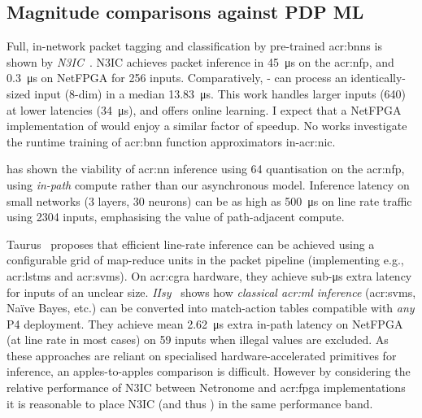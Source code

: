\subsection{Magnitude comparisons against PDP ML}
Full, in-network packet tagging and classification by pre-trained \glspl{acr:bnn} is shown by \emph{N3IC}~\parencite{DBLP:journals/corr/abs-2009-02353}.
N3IC achieves packet inference in \qty{45}{\micro\second} on the \gls{acr:nfp}, and \qty{0.3}{\micro\second} on NetFPGA for \qty{256}{\bit} inputs.
Comparatively, \approachshort{}-\Coopfw{} can process an identically-sized input (8-dim) in a median \qty{13.83}{\micro\second}.
This work handles larger inputs (\qty{640}{\bit}) at lower latencies (\qty{34}{\micro\second}), and offers online learning.
I expect that a NetFPGA implementation of \approachshort{} would enjoy a similar factor of speedup.
No works investigate the runtime training of \gls{acr:bnn} function approximators in-\gls{acr:nic}.

\textcite{langlet-ml-netronome} has shown the viability of \gls{acr:nn} inference using \qty{64}{\bit} quantisation on the \gls{acr:nfp}, using \emph{in-path} compute rather than our asynchronous model.
Inference latency on small networks (3 layers, \num{30} neurons) can be as high as \qty{500}{\micro\second} on line rate traffic using \qty{2304}{\bit} inputs, emphasising the value of path-adjacent compute.

Taurus~\parencite{DBLP:journals/corr/abs-2002-08987} proposes that efficient line-rate inference can be achieved using a configurable grid of map-reduce units in the packet pipeline (implementing e.g., \glspl{acr:lstm} and \glspl{acr:svm}).
On \gls{acr:cgra} hardware, they achieve sub-\si{\micro\second} extra latency for inputs of an unclear size.
\emph{IIsy}~\parencite{DBLP:conf/hotnets/XiongZ19} shows how \emph{classical \gls{acr:ml} inference} (\glspl{acr:svm}, Na\"{i}ve Bayes, etc.) can be converted into match-action tables compatible with \emph{any} P4 deployment.
They achieve mean \qty{2.62}{\micro\second} extra in-path latency on NetFPGA (at line rate in most cases) on \qty{59}{\bit} inputs when illegal values are excluded.
As these approaches are reliant on specialised hardware-accelerated primitives for inference, an apples-to-apples comparison is difficult.
However by considering the relative performance of N3IC between Netronome and \gls{acr:fpga} implementations it is reasonable to place N3IC (and thus \approachshort{}) in the same performance band.